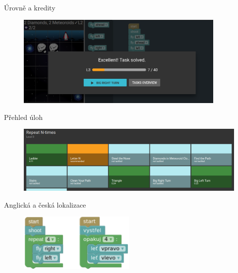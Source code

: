 \documentclass[
]{beamer}
\begin{document}
\begin{frame}{Úrovně a kredity}
\begin{figure}
\includegraphics[width=0.9\textwidth,height=.65\textheight,keepaspectratio]{../img/robomission-levels-credits}
\end{figure}
\end{frame}

\begin{frame}{Přehled úloh}
\begin{figure}
\includegraphics[width=\textwidth,height=.75\textheight,keepaspectratio]{../img/robomission-tasks-overview}
\end{figure}
\end{frame}

\begin{frame}{Anglická a česká lokalizace}
\begin{figure}
\includegraphics[width=0.5\textwidth,height=.75\textheight,keepaspectratio]{../img/roboblocks-english-czech}
\end{figure}
\end{frame}
\end{document}
